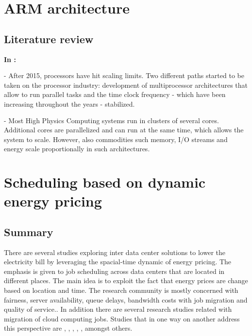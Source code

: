 \section{ARM architecture}
\subsection{Literature review}


\textbf{In \cite{ACAT13ARM}:}

- After 2015, processors have hit scaling limits. Two different paths started to be
taken on the processor industry:  development of multiprocessor architectures that
allow to run parallel tasks and the time clock frequency - which have been
increasing throughout the years - stabilized.

- Most High Physics Computing systems run in clusters of several cores.
Additional cores are parallelized and can run at the same time, which allows the
system to scale. However, also commodities such memory, I/O streams and energy
scale proportionally in such architectures.
 


\section{Scheduling based on dynamic energy pricing}



\subsection{Summary}

There are several studies exploring inter data center solutions to lower
the electricity bill by leveraging the spacial-time dynamic of energy pricing. The 
emphasis is given to job scheduling across data centers that are located in 
different places. The main idea is to exploit the fact that energy prices 
are change based on location and time. The research community is mostly concerned 
with fairness, server availability, queue delays, bandwidth costs with job migration
and quality of service.. In addition there are several research studies related with 
migration of cloud computing jobs. Studies that in one way on another address this 
perspective are \cite{EFF_JOB_SCHEDULING}, \cite{MIGRATION_CLOUD}, 
\cite{MINIMIZING_DIST}, \cite{CUTTING_BILL}, \cite{SCHED_HETEROGE}, amongst others. 

